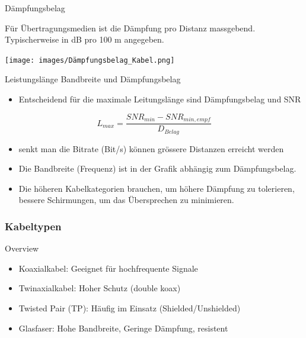     \begin{definition}{Dämpfungsbelag}\\
        \begin{minipage}{0.35\linewidth}
        Für Übertragungsmedien ist die Dämpfung pro Distanz massgebend. Typischerweise in dB pro 100 m angegeben. \\
        \end{minipage}
        \begin{minipage}{0.6\linewidth}
            \begin{center}
            \texttt{[image: images/Dämpfungsbelag\_Kabel.png]}
            \end{center}
        \end{minipage}
    \end{definition}

    \begin{concept}{Leistungslänge Bandbreite und Dämpfungsbelag}
        \begin{itemize}
            \item Entscheidend für die maximale Leitungslänge sind Dämpfungsbelag und SNR
        \end{itemize}
        $$L_{max} = \frac{SNR_{min} - SNR_{min,empf}}{D_{Belag}}$$
        \begin{itemize}
            \item senkt man die Bitrate (Bit/s) können grössere Distanzen erreicht werden
            \item Die Bandbreite (Frequenz) ist in der Grafik abhängig zum Dämpfungsbelag.
            \item Die höheren Kabelkategorien brauchen, um höhere Dämpfung zu tolerieren, bessere Schirmungen, um das Übersprechen zu minimieren.
        \end{itemize}
    \end{concept}

    

    \subsubsection{Kabeltypen}
    \begin{concept}{Overview}
        \begin{itemize}
            \item Koaxialkabel: Geeignet für hochfrequente Signale
            \item Twinaxialkabel: Hoher Schutz (double koax)
            \item Twisted Pair (TP): Häufig im Einsatz (Shielded/Unshielded)
            \item Glasfaser: Hohe Bandbreite, Geringe Dämpfung, resistent
        \end{itemize}        
    \end{concept}

